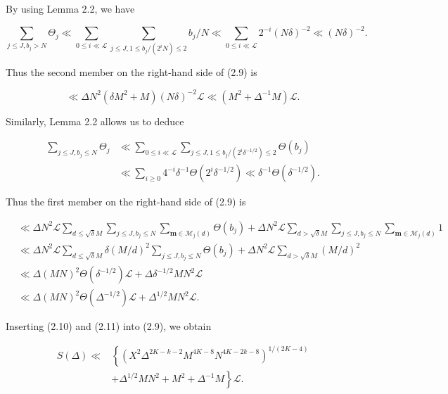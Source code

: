 \documentclass[10pt]{article}
\begin{document}
By using Lemma 2.2, we have

$$
\sum_{j \leqslant J, b_{j}>N} \Theta_{j} \ll \sum_{0 \leqslant i \ll \mathscr{L}} \sum_{j \leqslant J, 1\leqslant b_j/(2^iN)\leqslant 2} b_{j} / N \ll \sum_{0 \leqslant i \ll \mathscr{L}} 2^{-i}(N \delta)^{-2} \ll(N \delta)^{-2} .
$$

Thus the second member on the right-hand side of (2.9) is


\begin{equation*}
\ll \Delta N^{2}\left(\delta M^{2}+M\right)(N \delta)^{-2} \mathscr{L} \ll\left(M^{2}+\Delta^{-1} M\right) \mathscr{L} . \tag{2.10}
\end{equation*}


Similarly, Lemma 2.2 allows us to deduce

$$
\begin{aligned}
\sum_{j \leqslant J, b_{j} \leqslant N} \Theta_{j} & \ll \sum_{0 \leqslant i \ll \mathscr{L}} \sum_{j \leqslant J, 1\leqslant b_j/(2^i\delta^{-1/2})\leqslant 2} \Theta\left(b_{j}\right) \\
& \ll \sum_{i \geqslant 0} 4^{-i} \delta^{-1} \Theta\left(2^{i} \delta^{-1 / 2}\right) \ll \delta^{-1} \Theta\left(\delta^{-1 / 2}\right) .
\end{aligned}
$$

Thus the first member on the right-hand side of (2.9) is


\begin{align*}
& \ll \Delta N^{2} \mathscr{L} \sum_{d \leqslant \sqrt{\delta} M} \sum_{j \leqslant J, b_{j} \leqslant N} \sum_{\mathbf{m} \in \mathscr{M}_{j}(d)} \Theta\left(b_{j}\right)+\Delta N^{2} \mathscr{L} \sum_{d>\sqrt{\delta} M} \sum_{j \leqslant J, b_{j} \leqslant N} \sum_{\mathbf{m} \in \mathscr{M}_{j}(d)} 1 \\
& \ll \Delta N^{2} \mathscr{L} \sum_{d \leqslant \sqrt{\delta} M} \delta(M / d)^{2} \sum_{j \leqslant J, b_{j} \leqslant N} \Theta\left(b_{j}\right)+\Delta N^{2} \mathscr{L} \sum_{d>\sqrt{\delta} M}(M / d)^{2} \\
& \ll \Delta(M N)^{2} \Theta\left(\delta^{-1 / 2}\right) \mathscr{L}+\Delta \delta^{-1 / 2} M N^{2} \mathscr{L} \\
& \ll \Delta(M N)^{2} \Theta\left(\Delta^{-1 / 2}\right) \mathscr{L}+\Delta^{1 / 2} M N^{2} \mathscr{L} . \tag{2.11}
\end{align*}


Inserting (2.10) and (2.11) into (2.9), we obtain


\begin{align*}
S(\Delta) \ll & \left\{\left(X^{2} \Delta^{2 K-k-2} M^{4 K-8} N^{4 K-2 k-8}\right)^{1 /(2 K-4)}\right. \\
& \left.+\Delta^{1 / 2} M N^{2}+M^{2}+\Delta^{-1} M\right\} \mathscr{L} . \tag{2.12}
\end{align*}
\end{document}
